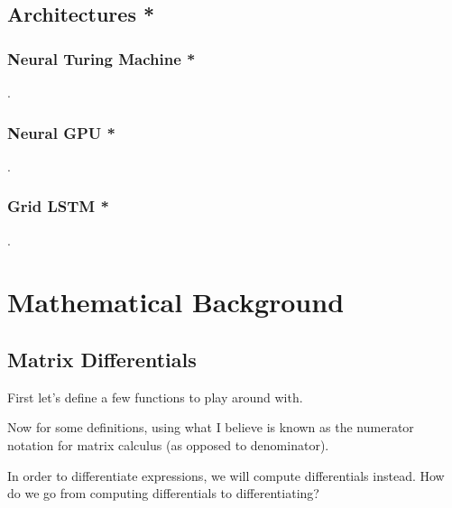 \documentclass[12pt]{article}
\begin{document}
\subsection{Architectures *}

\subsubsection{Neural Turing Machine *}
.
\subsubsection{Neural GPU *}
.
\subsubsection{Grid LSTM *}
.
\section{Mathematical Background}

\subsection{Matrix Differentials}

First let's define a few functions to play around with.


Now for some definitions, using what I believe is known as the numerator notation for matrix calculus (as opposed to denominator).



In order to differentiate expressions, we will compute differentials instead. How do we go from computing differentials to differentiating?
\end{document}
